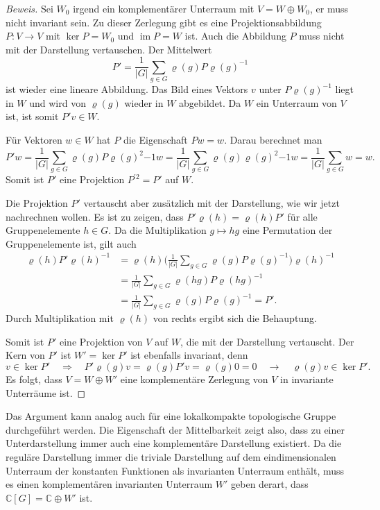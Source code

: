 \begin{proof}[Beweis]
Sei $W_0$ irgend ein komplementärer Unterraum mit $V=W\oplus W_0$, er muss
nicht invariant sein.
Zu dieser Zerlegung gibt es eine Projektionsabbildung $P\colon V\to V$ mit
$\operatorname{ker}P=W_0$ und $\operatorname{im}P=W$ ist.
Auch die Abbildung $P$ muss nicht mit der Darstellung vertauschen.
Der Mittelwert 
\[
P'
=
\frac{1}{|G|}
\sum_{g\in G}
\varrho(g) P \varrho(g)^{-1}
\]
ist wieder eine lineare Abbildung.
Das Bild eines Vektors $v$ unter $P\varrho(g)^{-1}$ liegt in $W$ und wird
von $\varrho(g)$ wieder in $W$ abgebildet.
Da $W$ ein Unterraum von $V$ ist, ist somit $P'v\in W$.

Für Vektoren $w\in W$ hat $P$ die Eigenschaft $Pw=w$.
Darau berechnet man
\[
P'w
=
\frac{1}{|G|}
\sum_{g\in G}
\varrho(g) P\varrho(g)^2{-1}w
=
\frac{1}{|G|}
\sum_{g\in G}
\varrho(g) \varrho(g)^2{-1}w
=
\frac{1}{|G|}
\sum_{g\in G}
w
=
w.
\]
Somit ist $P'$ eine Projektion $P^{\prime 2}=P'$ auf $W$.

Die Projektion $P'$ vertauscht aber zusätzlich mit der Darstellung, wie
wir jetzt nachrechnen wollen.
Es ist zu zeigen, dass $P'\varrho(h) = \varrho(h)P'$ für alle
Gruppenelemente $h\in G$.
Da die Multiplikation $g\mapsto hg$ eine Permutation der Gruppenelemente
ist, gilt auch
\begin{align*}
\varrho(h)P'\varrho(h)^{-1}
&=
\varrho(h)
\biggl(\frac{1}{|G|}\sum_{g\in G} \varrho(g)P\varrho(g)^{-1}\biggr)
\varrho(h)^{-1}
\\
&=
\frac{1}{|G|}
\sum_{g\in G} \varrho(hg)P\varrho(hg)^{-1}
\\
&=
\frac{1}{|G|}
\sum_{g\in G} \varrho(g)P\varrho(g)^{-1}
=
P'.
\end{align*}
Durch Multiplikation mit $\varrho(h)$ von rechts ergibt sich die Behauptung.

Somit ist $P'$ eine Projektion von $V$ auf $W$, die mit der Darstellung
vertauscht.
Der Kern von $P'$ ist $W'=\ker P'$ ist ebenfalls invariant, denn
\[
v\in\ker P'
\quad\Rightarrow\quad
P'
\varrho(g)v
=
\varrho(g)P'v
=
\varrho(g)0
=
0
\quad\rightarrow\quad
\varrho(g)v
\in \ker P'.
\]
Es folgt, dass $V=W\oplus W'$ eine komplementäre Zerlegung von $V$ in
invariante Unterräume ist.
\end{proof}

Das Argument kann analog auch für eine lokalkompakte topologische Gruppe
durchgeführt werden.
Die Eigenschaft der Mittelbarkeit zeigt also, dass zu einer Unterdarstellung
immer auch eine komplementäre Darstellung existiert.
Da die reguläre Darstellung immer die triviale Darstellung auf dem
eindimensionalen Unterraum der konstanten Funktionen als invarianten
Unterraum enthält, muss es einen komplementären invarianten Unterraum $W'$
geben derart, dass $\mathbb{C}[G]=\mathbb{C}\oplus W'$ ist.

